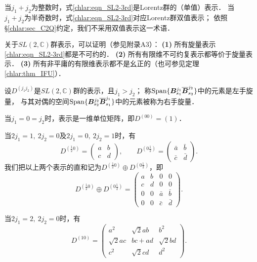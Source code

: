 当$j_1+j_2$为整数时，式\eqref{chlar:eqn_SL2-3rd}是Lorentz群的（单值）表示．
当$j_1+j_2$为半奇数时，式\eqref{chlar:eqn_SL2-3rd}对应Lorentz群{\kaishu 双值表示}；
依照\S\ref{chlar:sec_C2Q}约定，我们不采用双值表示这一术语．

关于$SL(2,\mathbb{C})$群表示，可以证明（参见\parencite{carmeli-rl1976}附录A3）：
{\bfseries (1)} 所有旋量表示\eqref{chlar:eqn_SL2-3rd}都是不可约的．
{\bfseries (2)} 所有有限维不可约复表示都等价于旋量表示．
{\bfseries (3)} 所有非平庸的有限维表示都不是幺正的（也可参见定理\ref{chlar:thm_IFU}）．

 
 
\begin{definition}
	设$D^{(j_1 j_2)}$是$SL(2,\mathbb{C})$群的表示，且$j_1>j_2$；
	称${\rm Span}\{\boldsymbol{B}^{j_1}_{s_1} \overline{\boldsymbol{B}}^{j_2}_{s_2}\}$中的元素是{\heiti 左手旋量}，
	与其对偶的空间${\rm Span}\{\boldsymbol{B}^{j_2}_{s_2} \overline{\boldsymbol{B}}^{j_1}_{s_1}\}$中的元素被称为{\heiti 右手旋量}．
\end{definition}


当$j_1=0=j_2$时，表示是一维单位矩阵，即$D^{(00)}=(1)$．

当$2j_1=1,\ 2j_2=0$及$2j_1=0,\ 2j_2=1$时，有
\begin{equation}
    D^{(\frac{1}{2}0)} = \begin{pmatrix} a & b   \\ c & d   \end{pmatrix},\qquad
    D^{(0\frac{1}{2})} = \begin{pmatrix} \bar{a} & \bar{b}   \\ \bar{c} & \bar{d}   \end{pmatrix}.
\end{equation}
我们把以上两个表示的直和记为$D^{(\frac{1}{2}0)} \oplus D^{(0\frac{1}{2})}$，即
\begin{equation}
    D^{(\frac{1}{2}0)} \oplus D^{(0\frac{1}{2})}= 
    \begin{pmatrix}
        a & b & 0 & 0   \\ 
        c & d & 0 & 0 \\
        0 & 0 & \bar{a} & \bar{b}  \\ 
        0 & 0 & \bar{c} & \bar{d}
    \end{pmatrix}.
\end{equation}

当$2j_1=2,\ 2j_2=0$时，有
\begin{equation}
    D^{(10)} = \begin{pmatrix} 
            a^2 & \sqrt{2} a b & b^2 \\
            \sqrt{2} a c & b c+a d & \sqrt{2} b d \\
            c^2 & \sqrt{2} c d & d^2 
    \end{pmatrix}.
\end{equation}


